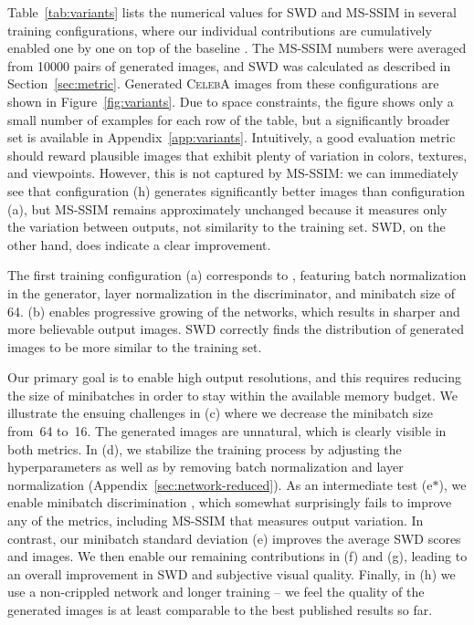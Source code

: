 \documentclass{article}
\begin{document}
Table~\ref{tab:variants} lists the numerical values for SWD and MS-SSIM in several training configurations, where our individual contributions are cumulatively enabled one by one on top of the baseline \citep{Gulrajani2017}. The MS-SSIM numbers were averaged from 10000 pairs of generated images, and SWD was calculated as described in Section~\ref{sec:metric}. Generated \textsc{CelebA} images from these configurations are shown in Figure~\ref{fig:variants}.
Due to space constraints, the figure shows only a small number of examples for each row of the table, but a significantly broader set is available in Appendix~\ref{app:variants}. 
Intuitively, a good evaluation metric should reward plausible images that exhibit plenty of variation in colors, textures, and viewpoints. 
However, this is not captured by MS-SSIM: we can immediately see that configuration (h) generates significantly better images than configuration (a), but MS-SSIM remains approximately unchanged because it measures only the variation between outputs, not similarity to the training set. SWD, on the other hand, does indicate a clear improvement.

The first training configuration (a) corresponds to \cite{Gulrajani2017}, featuring batch normalization in the generator, layer normalization in the discriminator, and minibatch size of 64. (b) enables progressive growing of the networks, which results in sharper and more believable output images. SWD correctly finds the distribution of generated images to be more similar to the training set.%

Our primary goal is to enable high output resolutions, and this requires reducing the size of minibatches in order to stay within the available memory budget. We illustrate the ensuing challenges in (c) where we decrease the minibatch size from~64 to~16. The generated images are unnatural, which is clearly visible in both metrics. %
In (d), we stabilize the training process by adjusting the hyperparameters as well as by removing batch normalization and layer normalization (Appendix~\ref{sec:network-reduced}). 
As an intermediate test (e$\ast$), we enable minibatch discrimination \citep{Salimans2016B}, which somewhat surprisingly fails to improve any of the metrics, including MS-SSIM that measures output variation.
In contrast, our minibatch standard deviation (e) improves the average SWD scores and images.
We then enable our remaining contributions in (f) and (g), leading to an overall improvement in SWD and subjective visual quality. %
Finally, in (h) we use a non-crippled network and longer training -- we feel the quality of the generated images is at least comparable to the best published results so far.
\end{document}
